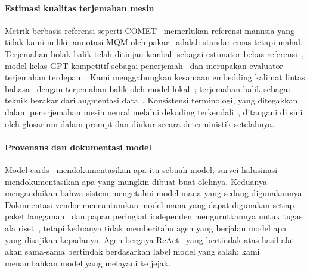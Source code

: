 \paragraph{Estimasi kualitas terjemahan mesin}
Metrik berbasis referensi seperti COMET~\cite{rei2020comet} memerlukan referensi manusia yang tidak kami miliki; annotasi MQM oleh pakar~\cite{freitag2021mqm} adalah standar emas tetapi mahal. Terjemahan bolak-balik telah ditinjau kembali sebagai estimator bebas referensi~\cite{moon2020roundtrip}, model kelas GPT kompetitif sebagai penerjemah~\cite{hendy2023gpt} dan merupakan evaluator terjemahan terdepan~\cite{kocmi2023gemba}. Kami menggabungkan kesamaan embedding kalimat lintas bahasa~\cite{reimers2019sbert,reimers2020multilingual} dengan terjemahan balik oleh model lokal~\cite{gemma2025}; terjemahan balik sebagai teknik berakar dari augmentasi data~\cite{sennrich2016backtranslation}. Konsistensi terminologi, yang ditegakkan dalam penerjemahan mesin neural melalui dekoding terkendali~\cite{dinu2019terminology}, ditangani di sini oleh glosarium dalam prompt dan diukur secara deterministik setelahnya.

\paragraph{Provenans dan dokumentasi model}
Model cards~\cite{mitchell2019modelcards} mendokumentasikan apa itu sebuah model; survei halusinasi~\cite{ji2023hallucination} mendokumentasikan apa yang mungkin dibuat-buat olehnya. Keduanya mengandaikan bahwa sistem mengetahui model mana yang sedang digunakannya. Dokumentasi vendor mencantumkan model mana yang dapat digunakan setiap paket langganan~\cite{githubdocs2026models} dan papan peringkat independen mengurutkannya untuk tugas ala riset~\cite{artificialanalysis2026}, tetapi keduanya tidak memberitahu agen yang berjalan model apa yang disajikan kepadanya. Agen bergaya ReAct~\cite{yao2023react} yang bertindak atas hasil alat akan sama-sama bertindak berdasarkan label model yang salah; kami menambahkan model yang melayani ke jejak.
